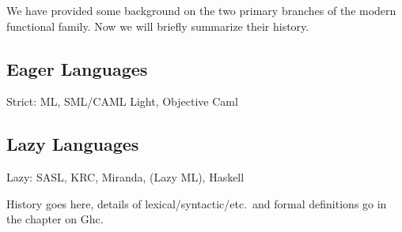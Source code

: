 We have provided some background on the two primary branches of the modern functional family. Now we will briefly summarize their history.

\subsection{Eager Languages}
Strict: ML, SML/CAML Light, Objective Caml

\subsection{Lazy Languages}
Lazy: SASL, KRC, Miranda, (Lazy ML), Haskell

History goes here, details of lexical/syntactic/etc.~and formal definitions go in the chapter on Ghc.

